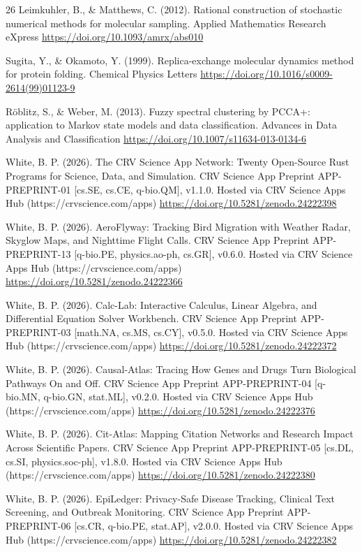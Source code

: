 \documentclass[10pt,letterpaper]{article}
\begin{document}
\begin{thebibliography}{26}
 Leimkuhler, B., \& Matthews, C. (2012). Rational construction of stochastic numerical methods for molecular sampling. Applied Mathematics Research eXpress \url{https://doi.org/10.1093/amrx/abs010}

 Sugita, Y., \& Okamoto, Y. (1999). Replica-exchange molecular dynamics method for protein folding. Chemical Physics Letters \url{https://doi.org/10.1016/s0009-2614(99)01123-9}

 Röblitz, S., \& Weber, M. (2013). Fuzzy spectral clustering by PCCA+: application to Markov state models and data classification. Advances in Data Analysis and Classification \url{https://doi.org/10.1007/s11634-013-0134-6}

 White, B. P. (2026). The CRV Science App Network: Twenty Open-Source Rust Programs for Science, Data, and Simulation. CRV Science App Preprint APP-PREPRINT-01 [cs.SE, cs.CE, q-bio.QM], v1.1.0. Hosted via CRV Science Apps Hub (https://crvscience.com/apps) \url{https://doi.org/10.5281/zenodo.24222398}

 White, B. P. (2026). AeroFlyway: Tracking Bird Migration with Weather Radar, Skyglow Maps, and Nighttime Flight Calls. CRV Science App Preprint APP-PREPRINT-13 [q-bio.PE, physics.ao-ph, cs.GR], v0.6.0. Hosted via CRV Science Apps Hub (https://crvscience.com/apps) \url{https://doi.org/10.5281/zenodo.24222366}

 White, B. P. (2026). Calc-Lab: Interactive Calculus, Linear Algebra, and Differential Equation Solver Workbench. CRV Science App Preprint APP-PREPRINT-03 [math.NA, cs.MS, cs.CY], v0.5.0. Hosted via CRV Science Apps Hub (https://crvscience.com/apps) \url{https://doi.org/10.5281/zenodo.24222372}

 White, B. P. (2026). Causal-Atlas: Tracing How Genes and Drugs Turn Biological Pathways On and Off. CRV Science App Preprint APP-PREPRINT-04 [q-bio.MN, q-bio.GN, stat.ML], v0.2.0. Hosted via CRV Science Apps Hub (https://crvscience.com/apps) \url{https://doi.org/10.5281/zenodo.24222376}

 White, B. P. (2026). Cit-Atlas: Mapping Citation Networks and Research Impact Across Scientific Papers. CRV Science App Preprint APP-PREPRINT-05 [cs.DL, cs.SI, physics.soc-ph], v1.8.0. Hosted via CRV Science Apps Hub (https://crvscience.com/apps) \url{https://doi.org/10.5281/zenodo.24222380}

 White, B. P. (2026). EpiLedger: Privacy-Safe Disease Tracking, Clinical Text Screening, and Outbreak Monitoring. CRV Science App Preprint APP-PREPRINT-06 [cs.CR, q-bio.PE, stat.AP], v2.0.0. Hosted via CRV Science Apps Hub (https://crvscience.com/apps) \url{https://doi.org/10.5281/zenodo.24222382}


\end{thebibliography}
\end{document}
